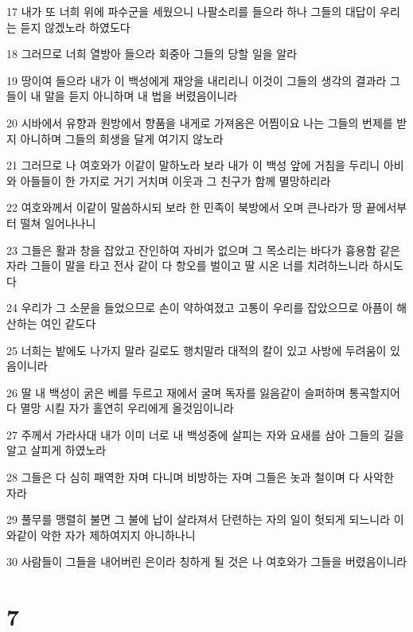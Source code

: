 \par 17 내가 또 너희 위에 파수군을 세웠으니 나팔소리를 들으라 하나 그들의 대답이 우리는 듣지 않겠노라 하였도다
\par 18 그러므로 너희 열방아 들으라 회중아 그들의 당할 일을 알라
\par 19 땅이여 들으라 내가 이 백성에게 재앙을 내리리니 이것이 그들의 생각의 결과라 그들이 내 말을 듣지 아니하며 내 법을 버렸음이니라
\par 20 시바에서 유향과 원방에서 향품을 내게로 가져옴은 어찜이요 나는 그들의 번제를 받지 아니하며 그들의 희생을 달게 여기지 않노라
\par 21 그러므로 나 여호와가 이같이 말하노라 보라 내가 이 백성 앞에 거침을 두리니 아비와 아들들이 한 가지로 거기 거치며 이웃과 그 친구가 함께 멸망하리라
\par 22 여호와께서 이같이 말씀하시되 보라 한 민족이 북방에서 오며 큰나라가 땅 끝에서부터 떨쳐 일어나나니
\par 23 그들은 활과 창을 잡았고 잔인하여 자비가 없으며 그 목소리는 바다가 흉용함 같은 자라 그들이 말을 타고 전사 같이 다 항오를 벌이고 딸 시온 너를 치려하느니라 하시도다
\par 24 우리가 그 소문을 들었으므로 손이 약하여졌고 고통이 우리를 잡았으므로 아픔이 해산하는 여인 같도다
\par 25 너희는 밭에도 나가지 말라 길로도 행치말라 대적의 칼이 있고 사방에 두려움이 있음이니라
\par 26 딸 내 백성이 굵은 베를 두르고 재에서 굴며 독자를 잃음같이 슬퍼하며 통곡할지어다 멸망 시킬 자가 홀연히 우리에게 올것임이니라
\par 27 주께서 가라사대 내가 이미 너로 내 백성중에 살피는 자와 요새를 삼아 그들의 길을 알고 살피게 하였노라
\par 28 그들은 다 심히 패역한 자며 다니며 비방하는 자며 그들은 놋과 철이며 다 사악한 자라
\par 29 풀무를 맹렬히 불면 그 불에 납이 살라져서 단련하는 자의 일이 헛되게 되느니라 이와같이 악한 자가 제하여지지 아니하나니
\par 30 사람들이 그들을 내어버린 은이라 칭하게 될 것은 나 여호와가 그들을 버렸음이니라

\chapter{7}

